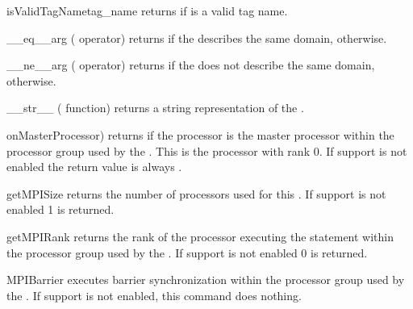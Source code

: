 %
\begin{methoddesc}[Domain]{isValidTagName}{tag_name}
    returns \True if  is a valid tag name.
\end{methoddesc}
%
\begin{methoddesc}[Domain]{__eq__}{arg}
    (\PYTHON \var{==} operator) returns \True if the \Domain {}
    describes the same domain, \False otherwise.
\end{methoddesc}
%
\begin{methoddesc}[Domain]{__ne__}{arg}
    (\PYTHON \var{!=} operator) returns \True if the \Domain {} does
    not describe the same domain, \False otherwise.
\end{methoddesc}
%
\begin{methoddesc}[Domain]{__str__}{}
    (\PYTHON {} function) returns a string representation of the
    \Domain.
\end{methoddesc}
%
\begin{methoddesc}[Domain]{onMasterProcessor)}{}
    returns \True if the processor is the master processor within the \MPI
    processor group used by the \Domain. This is the processor with rank 0.
    If \MPI support is not enabled the return value is always \True.
\end{methoddesc}
%
\begin{methoddesc}[Domain]{getMPISize}{}
    returns the number of \MPI processors used for this \Domain. If \MPI
    support is not enabled 1 is returned.
\end{methoddesc}
%
\begin{methoddesc}[Domain]{getMPIRank}{}
    returns the rank of the processor executing the statement within the
    \MPI processor group used by the \Domain. If \MPI support is not enabled
    0 is returned.
\end{methoddesc}
%
\begin{methoddesc}[Domain]{MPIBarrier}{}
    executes barrier synchronization within the \MPI processor group used by
    the \Domain. If \MPI support is not enabled, this command does nothing.
\end{methoddesc}

